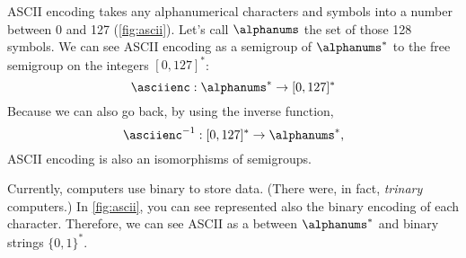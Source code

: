 \begin{example}
    ASCII encoding takes any alphanumerical characters and symbols into a number between 0 and 127 (\cref{fig:ascii}).
    Let's call $\alphanums$ the set of those 128 symbols.
    We can see ASCII encoding as a semigroup \whomo of $\alphanums^*$ to the free semigroup on the integers $[0,127]^*$:
    \begin{equation} \label{eq:ASCII-semi}
    \asciienc: \alphanums^* \to  [0,127]^*
    \end{equation}
    Because we can also go back, by using the inverse function,
 \begin{equation} \label{eq:ASCII-semi-inv}
    \asciienc^{-1}:  [0,127]^*  \to  \alphanums^*,
    \end{equation}
    ASCII encoding is also an isomorphisms of semigroups.


\end{example}
\begin{example}
    Currently, computers use binary to store data. (There were, in fact, \emph{trinary} computers.)
    In \cref{fig:ascii}, you can see represented also the binary encoding of each character.
    Therefore, we can see ASCII as a \whomo between $\alphanums^*$ and binary strings $\{0,1\}^*$.
\end{example}

